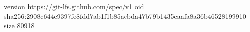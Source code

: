 version https://git-lfs.github.com/spec/v1
oid sha256:2908c644e9397fe8fdd7ab1f1b85aebda47b79b1435eaafa8a36b46528199910
size 80918
